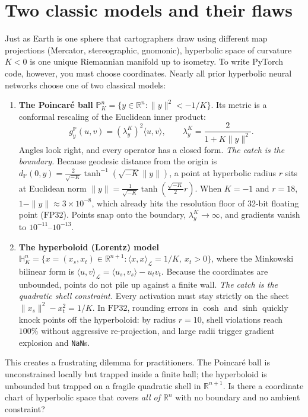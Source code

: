 \section{Two classic models and their flaws}

Just as Earth is one sphere that cartographers draw using different map projections (Mercator, stereographic, gnomonic), hyperbolic space of curvature \(K<0\) is one unique Riemannian manifold up to isometry. To write PyTorch code, however, you must choose coordinates. Nearly all prior hyperbolic neural networks choose one of two classical models:

\begin{enumerate}
  \item \textbf{The Poincar\'e ball} \(\mathbb{P}_K^n = \{y\in\mathbb{R}^n : \|y\|^2 < -1/K\}\).
  Its metric is a conformal rescaling of the Euclidean inner product:
  \[
    g_y^{\mathbb{P}}(u,v) = (\lambda_y^K)^2\langle u,v\rangle,
    \qquad
    \lambda_y^K = \frac{2}{1+K\|y\|^2}.
  \]
  Angles look right, and every operator has a closed form. \emph{The catch is the boundary.} Because geodesic distance from the origin is \(d_{\mathbb{P}}(0,y) = \frac{2}{\sqrt{-K}}\tanh^{-1}(\sqrt{-K}\|y\|)\), a point at hyperbolic radius \(r\) sits at Euclidean norm \(\|y\| = \frac{1}{\sqrt{-K}}\tanh(\frac{\sqrt{-K}}{2}r)\). When \(K=-1\) and \(r=18\), \(1-\|y\| \approx 3\times 10^{-8}\), which already hits the resolution floor of 32-bit floating point (\(\mathrm{FP32}\)). Points snap onto the boundary, \(\lambda_y^K\to\infty\), and gradients vanish to \(10^{-11}\text{--}10^{-13}\).

  \item \textbf{The hyperboloid (Lorentz) model} \(\mathbb{H}_K^n = \{x=(x_s,x_t)\in\mathbb{R}^{n+1} : \langle x,x\rangle_{\mathcal{L}} = 1/K,\ x_t > 0\}\), where the Minkowski bilinear form is \(\langle u,v\rangle_{\mathcal{L}} = \langle u_s,v_s\rangle - u_t v_t\).
  Because the coordinates are unbounded, points do not pile up against a finite wall. \emph{The catch is the quadratic shell constraint.} Every activation must stay strictly on the sheet \(\|x_s\|^2 - x_t^2 = 1/K\). In \(\mathrm{FP32}\), rounding errors in \(\cosh\) and \(\sinh\) quickly knock points off the hyperboloid: by radius \(r=10\), shell violations reach \(100\%\) without aggressive re-projection, and large radii trigger gradient explosion and \texttt{NaN}s.
\end{enumerate}

This creates a frustrating dilemma for practitioners. The Poincar\'e ball is unconstrained locally but trapped inside a finite ball; the hyperboloid is unbounded but trapped on a fragile quadratic shell in \(\mathbb{R}^{n+1}\). Is there a coordinate chart of hyperbolic space that covers \emph{all of \(\mathbb{R}^n\)} with no boundary and no ambient constraint?


